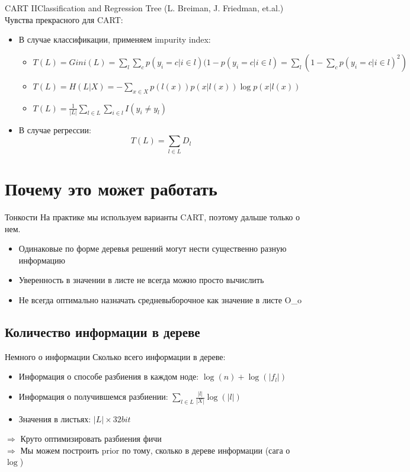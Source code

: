 \documentclass[14pt, fleqn, xcolor={dvipsnames, table}]{beamer}
\begin{document}
\begin{frame}{CART II}{Classification and Regression Tree (L. Breiman, J. Friedman, et.al.)}
Чувства прекрасного для CART:
\begin{itemize}
  \item В случае классификации, применяем impurity index:
  \begin{itemize}
    \item $T(L) = Gini(L) = \sum_l \sum_c p(y_i = c | i \in l)(1 - p(y_i=c|i \in l) = \sum_l (1 - \sum_c p(y_i=c|i \in l)^2)$
    \item $T(L) = H(L|X) = -\sum_{x\in X} p(l(x)) p(x|l(x)) \log p(x|l(x))$
    \item $T(L) = \frac{1}{|L|} \sum_{l\in L} \sum_{i \in l} I(y_i \ne y_l)$
  \end{itemize}
  \item В случае регрессии:
  $$
  T(L) = \sum_{l\in L} D_l
  $$
\end{itemize}
\end{frame}

\section{Почему это может работать}
\begin{frame}{Тонкости}
На практике мы используем варианты CART, поэтому дальше только о нем.
\begin{itemize}
  \item Одинаковые по форме деревья решений могут нести существенно разную информацию
  \item Уверенность в значении в листе не всегда можно просто вычислить
  \item Не всегда оптимально назначать средневыборочное как значение в листе O\_o
\end{itemize}
\end{frame}

\subsection{Количество информации в дереве}

\begin{frame}{Немного о информации}
Сколько всего информации в дереве:
\begin{itemize}
  \item Информация о способе разбиения в каждом ноде: $\log(n) + \log(|f_l|)$
  \item Информация о получившемся разбиении: $\sum_{l \in L} \frac{|l|}{|X|} \log (|l|)$
  \item Значения в листьях: $|L|\times32bit$
\end{itemize}
$\Rightarrow$ Круто оптимизировать разбиения фичи \\
$\Rightarrow$ Мы можем построить prior по тому, сколько в дереве информации (сага о $\log$)
\end{frame}
\end{document}
